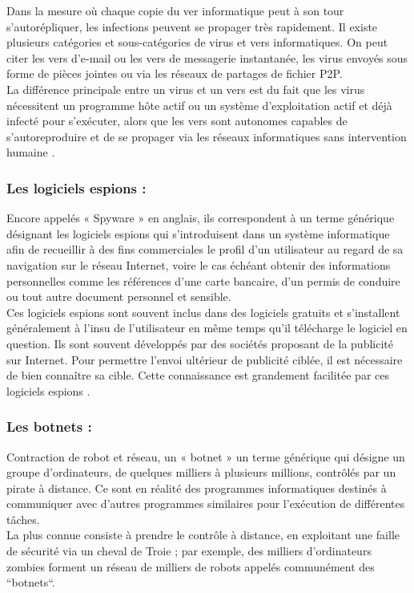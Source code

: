 Dans la mesure où chaque copie du ver informatique peut à son tour s’autorépliquer, les infections peuvent se propager très rapidement. Il existe plusieurs catégories et sous-catégories de virus et vers informatiques. On peut citer les vers d’e-mail ou les vers de messagerie instantanée, les virus envoyés sous forme de pièces jointes ou via les réseaux de partages de fichier P2P.\\

La différence principale entre un virus et un vers est du fait que les virus nécessitent un programme hôte actif ou un système d’exploitation actif et déjà infecté pour s’exécuter, alors que les vers sont autonomes capables de s’autoreproduire et de se propager via les réseaux informatiques sans intervention humaine \cite{ref13}.
\subsubsection{Les logiciels espions : }
Encore appelés « Spyware » en anglais, ils correspondent à un terme générique désignant les logiciels espions qui s’introduisent dans un système informatique afin de recueillir à des fins commerciales le profil d’un utilisateur au regard de sa navigation sur le réseau Internet, voire le cas échéant obtenir des informations personnelles comme les références d’une carte bancaire, d’un permis de conduire ou tout autre document personnel et sensible.\\

Ces logiciels espions sont souvent inclus dans des logiciels gratuits et s’installent généralement à l’insu de l’utilisateur en même temps qu’il télécharge le logiciel en question. Ils sont souvent développés par des sociétés proposant de la publicité sur Internet. Pour permettre l’envoi ultérieur de publicité ciblée, il est nécessaire de bien connaître sa cible. Cette connaissance est grandement facilitée par ces logiciels espions \cite{ref13}.
\subsubsection{Les botnets : }
Contraction de robot et réseau, un « botnet » un terme générique qui désigne un groupe d’ordinateurs, de quelques milliers à plusieurs millions, contrôlés par un pirate à distance. Ce sont en réalité des programmes informatiques destinés à communiquer avec d’autres programmes similaires pour l’exécution de différentes tâches.\\

La plus connue consiste à prendre le contrôle à distance, en exploitant une faille de sécurité via un cheval de Troie ; par exemple, des milliers d’ordinateurs zombies forment un réseau de milliers de robots appelés communément des “botnets“.\\

